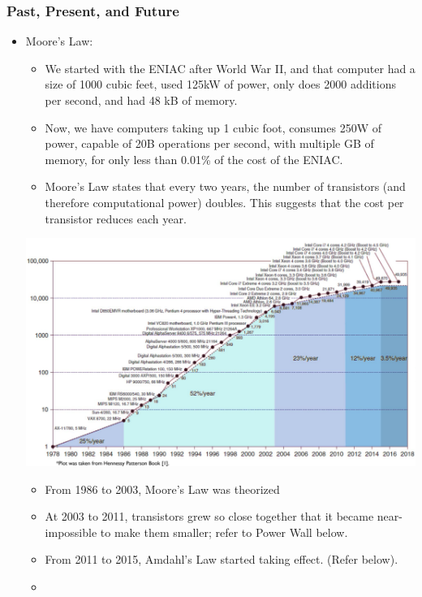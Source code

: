 \documentclass[10pt]{article}
\begin{document}
\subsubsection*{Past, Present, and Future}
\begin{itemize}
    \item Moore's Law: 
    \begin{itemize}
        \item We started with the ENIAC after World War II, and that computer had a size of 1000 cubic feet, used 125kW of power, only does 2000 additions per second, and had 48 kB of memory.
        \item Now, we have computers taking up 1 cubic foot, consumes 250W of power, capable of 20B operations per second, with multiple GB of memory, for only less than 0.01\% of the cost of the ENIAC.
        \item Moore's Law states that every two years, the number of transistors (and therefore computational power) doubles.  This suggests that the cost per transistor reduces each year.
    \end{itemize}
    \begin{center}
        \includegraphics*[scale=0.5]{W1_2.png}
    \end{center}
    \begin{itemize}
        \item From 1986 to 2003, Moore's Law was theorized
        \item At 2003 to 2011, transistors grew so close together that it became near-impossible to make them smaller; refer to Power Wall below.
        \item From 2011 to 2015, Amdahl's Law started taking effect.  (Refer below).
        \item 
    \end{itemize}


\end{itemize}
\end{document}
